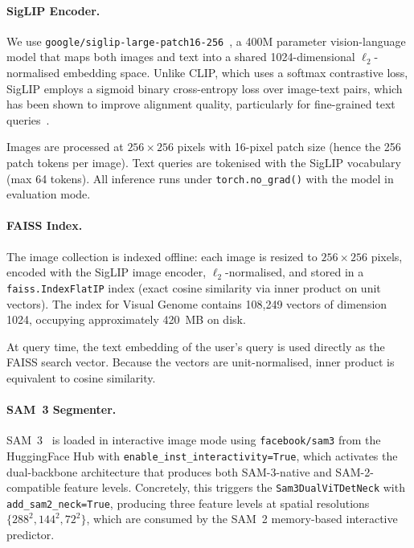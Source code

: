 \documentclass[12pt,a4paper]{article}
\begin{document}
\paragraph{SigLIP Encoder.}
We use \texttt{google/siglip-large-patch16-256}~\citep{Zhai2023}, a 400M
parameter vision-language model that maps both images and text into a shared
1024-dimensional $\ell_2$-normalised embedding space. Unlike CLIP, which uses
a softmax contrastive loss, SigLIP employs a sigmoid binary cross-entropy loss
over image-text pairs, which has been shown to improve alignment quality,
particularly for fine-grained text queries~\citep{Zhai2023}.

Images are processed at $256 \times 256$ pixels with 16-pixel patch size
(hence the 256 patch tokens per image). Text queries are tokenised with the
SigLIP vocabulary (max 64 tokens). All inference runs under
\texttt{torch.no\_grad()} with the model in evaluation mode.

\paragraph{FAISS Index.}
The image collection is indexed offline: each image is resized to $256\times
256$ pixels, encoded with the SigLIP image encoder, $\ell_2$-normalised, and
stored in a \texttt{faiss.IndexFlatIP} index (exact cosine similarity via inner
product on unit vectors). The index for Visual Genome contains 108,249 vectors
of dimension 1024, occupying approximately 420~MB on disk.

At query time, the text embedding of the user's query is used directly as the
FAISS search vector. Because the vectors are unit-normalised, inner product
is equivalent to cosine similarity.

\paragraph{SAM~3 Segmenter.}
SAM~3~\citep{Meta2025} is loaded in interactive image mode using
\texttt{facebook/sam3} from the HuggingFace Hub with
\texttt{enable\_inst\_interactivity=True}, which activates the dual-backbone
architecture that produces both SAM-3-native and SAM-2-compatible feature
levels. Concretely, this triggers the \texttt{Sam3DualViTDetNeck} with
\texttt{add\_sam2\_neck=True}, producing three feature levels at spatial
resolutions $\{288^2, 144^2, 72^2\}$, which are consumed by the SAM~2
memory-based interactive predictor.
\end{document}

